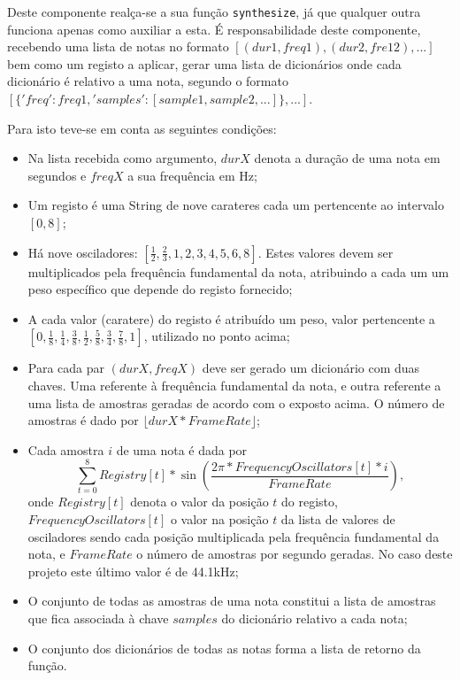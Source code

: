 \documentclass[a4paper,11pt,openright,oneside]{report}
\begin{document}
Deste componente realça-se a sua função \verb|synthesize|, já que qualquer outra funciona apenas como auxiliar a esta. É responsabilidade deste componente, recebendo uma lista de notas no formato $[(dur1, freq1), (dur2, fre12), ...]$ bem como um registo a aplicar, gerar uma lista de dicionários onde cada dicionário é relativo a uma nota, segundo o formato $[\{'freq': freq1, 'samples': [sample1, sample2, ...]\}, ...]$.

Para isto teve-se em conta as seguintes condições:

\begin{itemize}
\item Na lista recebida como argumento, $durX$ denota a duração de uma nota em segundos e $freqX$ a sua frequência em Hz;
\item Um registo é uma String de nove carateres cada um pertencente ao intervalo $[0, 8]$;
\item Há nove osciladores: $\left[\frac{1}{2}, \frac{2}{3}, 1, 2, 3, 4, 5, 6, 8\right]$. Estes valores devem ser multiplicados pela frequência fundamental da nota, atribuindo a cada um um peso específico que depende do registo fornecido;
\item A cada valor (caratere) do registo é atribuído um peso, valor pertencente a $\left[0, \frac{1}{8}, \frac{1}{4}, \frac{3}{8}, \frac{1}{2}, \frac{5}{8}, \frac{3}{4}, \frac{7}{8}, 1\right]$, utilizado no ponto acima;
\item Para cada par $(durX, freqX)$ deve ser gerado um dicionário com duas chaves. Uma referente à frequência fundamental da nota, e outra referente a uma lista de amostras geradas de acordo com o exposto acima. O número de amostras é dado por $\lfloor durX * FrameRate \rfloor$;
\item Cada amostra $i$ de uma nota é dada por
$$\sum_{t=0}^8 Registry[t] * \sin \left(\frac{2\pi * FrequencyOscillators[t] * i}{FrameRate}\right),$$
onde $Registry[t]$ denota o valor da posição $t$ do registo, $FrequencyOscillators[t]$ o valor na posição $t$ da lista de valores de osciladores sendo cada posição multiplicada pela frequência fundamental da nota, e $FrameRate$ o número de amostras por segundo geradas. No caso deste projeto este último valor é de 44.1kHz;
\item O conjunto de todas as amostras de uma nota constitui a lista de amostras que fica associada à chave $samples$ do dicionário relativo a cada nota;
\item O conjunto dos dicionários de todas as notas forma a lista de retorno da função.
\end{itemize}
\end{document}
